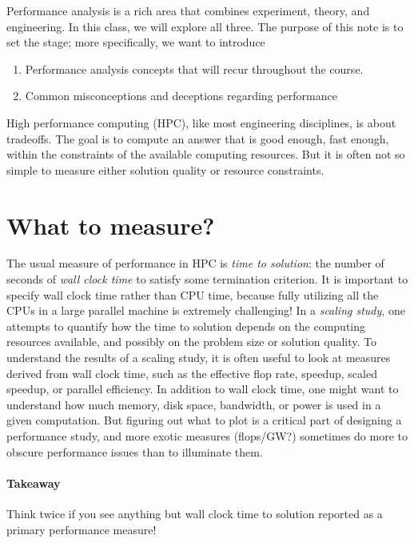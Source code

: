 \documentclass[12pt, leqno]{article} %
\begin{document}

Performance analysis is a rich area that combines experiment, theory,
and engineering. In this class, we will explore all three. The purpose
of this note is to set the stage; more specifically, we want to introduce

\begin{enumerate}
\item
  Performance analysis concepts that will recur
  throughout the course.
\item
  Common misconceptions and deceptions regarding
  performance
\end{enumerate}

High performance computing (HPC), like most engineering disciplines, is
about tradeoffs. The goal is to compute an answer that is good enough,
fast enough, within the constraints of the available computing
resources. But it is often not so simple to measure either solution
quality or resource constraints.

\section{What to measure?}

The usual measure of performance in HPC is \emph{time to solution}: the
number of seconds of \emph{wall clock time} to satisfy some termination
criterion. It is important to specify wall clock time rather than CPU
time, because fully utilizing all the CPUs in a large parallel machine
is extremely challenging! In a \emph{scaling study}, one attempts to
quantify how the time to solution depends on the computing resources
available, and possibly on the problem size or solution quality. To
understand the results of a scaling study, it is often useful to look at
measures derived from wall clock time, such as the effective flop rate,
speedup, scaled speedup, or parallel efficiency. In addition to wall
clock time, one might want to understand how much memory, disk space,
bandwidth, or power is used in a given computation. But figuring out
what to plot is a critical part of designing a performance study, and
more exotic measures (flops/GW?) sometimes do more to obscure
performance issues than to illuminate them.

\paragraph{Takeaway}

Think twice if you see anything but wall clock time to solution reported
as a primary performance measure!
\end{document}
